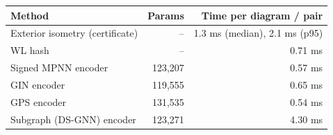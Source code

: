 \begin{tabular}{l r r}
\toprule
Method & Params & Time per diagram / pair\\
\midrule
Exterior isometry (certificate) & -- & 1.3 ms (median), 2.1 ms (p95)\\
WL hash & -- & 0.71 ms\\
Signed MPNN encoder & 123,207 & 0.57 ms\\
GIN encoder & 119,555 & 0.65 ms\\
GPS encoder & 131,535 & 0.54 ms\\
Subgraph (DS-GNN) encoder & 123,271 & 4.30 ms\\
\bottomrule
\end{tabular}
